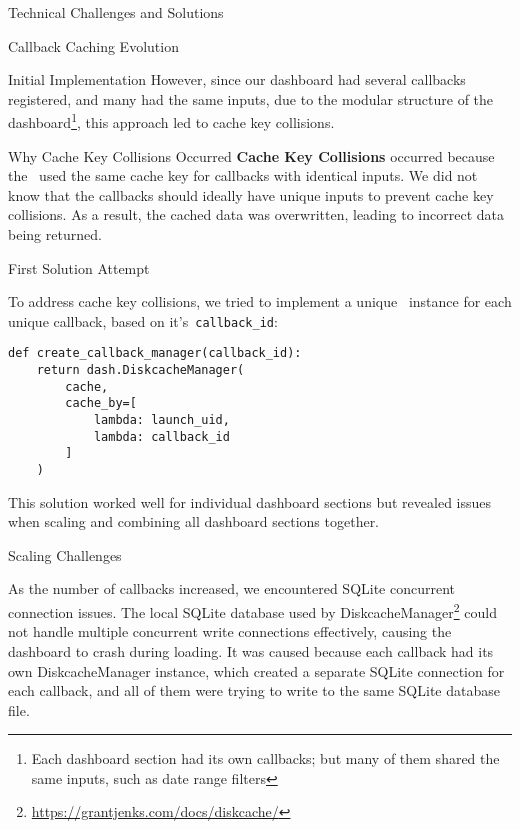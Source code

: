 \begin{section}{Technical Challenges and Solutions}
\begin{subsection}{Callback Caching Evolution}
\begin{subsubsection}{Initial Implementation}
			However, since our dashboard had several callbacks registered, and many had the same inputs,
			due to the modular structure of the dashboard\footnote{Each dashboard section had its own callbacks; but many of them shared the same inputs, such as date range filters}, this approach led to cache key collisions.

			\begin{infobox}{Why Cache Key Collisions Occurred}
				\textbf{Cache Key Collisions} occurred because the~ used the same cache key for callbacks with identical inputs.
				We did not know that the callbacks should ideally have unique inputs to prevent cache key collisions.
				As a result, the cached data was overwritten, leading to incorrect data being returned.
			\end{infobox}
		\end{subsubsection}

		\begin{subsubsection}{First Solution Attempt}
			\label{subsubsec:implementation-technical-challenges-caching-first}

			To address cache key collisions, we tried to implement a unique~ instance for each unique callback, based on it's~\texttt{callback\_id}:

			\begin{listing}[H]
				\caption{Unique Cache Managers Per Callback}
				\begin{verbatim}
def create_callback_manager(callback_id):
    return dash.DiskcacheManager(
        cache,
        cache_by=[
            lambda: launch_uid,
            lambda: callback_id
        ]
    )
				\end{verbatim}
				\label{lst:dashboard-implementation-cache-unique}
			\end{listing}

			This solution worked well for individual dashboard sections but revealed issues when scaling and combining all dashboard sections together.
		\end{subsubsection}

		\begin{subsubsection}{Scaling Challenges}
			\label{subsubsec:implementation-technical-challenges-caching-scaling}

			As the number of callbacks increased, we encountered SQLite concurrent connection issues.
			The local SQLite database used by DiskcacheManager\footnote{\url{https://grantjenks.com/docs/diskcache/}} could not handle multiple concurrent write connections effectively, causing the dashboard to crash during loading.
			It was caused because each callback had its own DiskcacheManager instance, which created a separate SQLite connection for each callback, and all of them were trying to write to the same SQLite database file.


\end{subsubsection}
\end{subsection}
\end{section}
